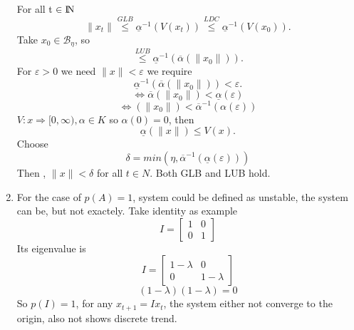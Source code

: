 \documentclass[a4paper,11pt,reqno]{amsart}
\newcommand{\N}{{\rm I\!N}}
\begin{document}
\begin{enumerate}
        For all t $\in \N$ 
            \begin{equation}
                \|x_t\| \overset{GLB}\leq \underline{\alpha}^ {-1} (V(x_t)) \overset{LDC}\leq \underline{\alpha}^{-1} (V(x_0)).
            \end{equation}
        Take $x_0 \in \mathcal{B}_\eta$, so
            \begin{equation}
                \overset{LUB}\leq \underline{\alpha}^ {-1} (\overline{\alpha}(\|x_0\|)).
            \end{equation}
        For $\varepsilon > 0$ we need $\|x\| < \varepsilon$ we require
            \begin{equation}
                \underline{\alpha}^ {-1} (\overline{\alpha}(\|x_0\|)) < \varepsilon.
            \end{equation}
            \begin{equation}
                \Leftrightarrow \overline{\alpha}(\|x_0\|) < \underline{\alpha}(\varepsilon)
            \end{equation}
            \begin{equation}
                \Leftrightarrow (\|x_0\|) < \overline{\alpha}^ {-1}(\alpha(\varepsilon))
            \end{equation}
                $V:x \Rightarrow [0,\infty), \alpha \in K$ so $\alpha(0) = 0$, then
            \begin{equation}
                \underline{\alpha}(\|x\|) \leq V(x).
            \end{equation}
        Choose
            \begin{equation}
                \delta = min (\eta,\overline{\alpha}^ {-1}(\underline{\alpha}(\varepsilon)))
            \end{equation}
        Then , $\|x\| < \delta $ for all $ t \in N$. Both GLB and LUB hold.
    \item For the case of $p(A) = 1$, system could be defined as unstable, the system can be, but not exactely.
        Take identity as example
        \begin{equation}
            I =
            \begin{bmatrix}
                1 & 0
                \\
                0 & 1
            \end{bmatrix}
        \end{equation}
        Its eigenvalue is 
        \begin{equation}
            I =
            \begin{bmatrix}
                1 - \lambda& 0
                \\
                0 & 1 - \lambda
            \end{bmatrix}
        \end{equation}
        \begin{equation}
            (1-\lambda)(1-\lambda) = 0
        \end{equation}
        So $p(I) = 1$, for any $x_{t+1} = I x_t$, the system either not converge to the origin, also not shows discrete trend.
\end{enumerate}
\end{document}
